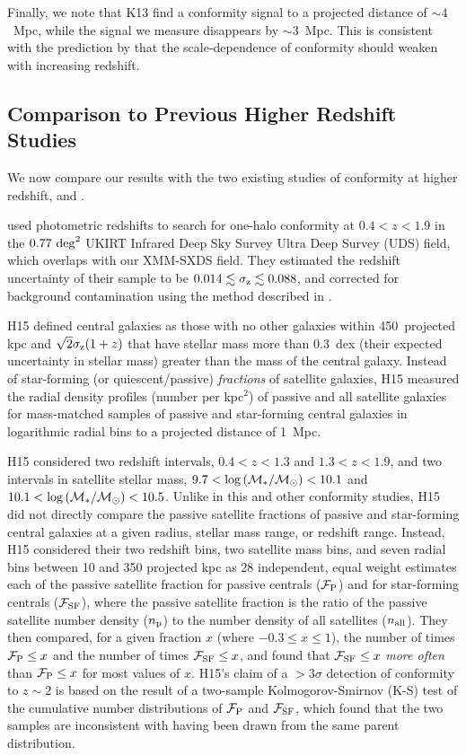Finally, we note that K13 find a conformity signal to a projected distance of $\sim4$~Mpc, while the signal we measure disappears by $\sim3$~Mpc.
This is consistent with the prediction by \citet{Hearin15b} that the scale-dependence of conformity should weaken with increasing redshift.

\subsection{Comparison to Previous Higher Redshift Studies}\label{sec:compare_high}

We now compare our results with the two existing studies of conformity at higher redshift, \citet{Hartley15} and \citet{Kawinwanichakij16}.

\citet[][hereafter H15]{Hartley15} used photometric redshifts to search for one-halo conformity at ${0.4<z<1.9}$ in the ${0.77~\degsq}$ 
UKIRT Infrared Deep Sky Survey \citep[UKIDSS;][]{Lawrence07} Ultra Deep Survey (UDS) field, which overlaps with our XMM-SXDS field.
They estimated the redshift uncertainty of their sample to be ${0.014 \lesssim \sigmaz \lesssim 0.088}$, and corrected for background contamination using the method described in \citet{Chen06}.

H15 defined central galaxies as those with no other galaxies within 450~projected kpc and ${\sqrt{2}\sigmaz(1 + z)}$
that have stellar mass more than 0.3~dex (their expected uncertainty in stellar mass) greater than the mass of the central galaxy.
Instead of star-forming (or quiescent/passive) \emph{fractions} of satellite galaxies,
H15 measured the radial density profiles (number per kpc$^2$) of passive and all satellite galaxies for mass-matched samples of passive and star-forming central galaxies in logarithmic radial bins to a projected distance of 1~Mpc.

H15 considered two redshift intervals, ${0.4<z<1.3}$ and ${1.3<z<1.9}$, and two intervals in satellite stellar mass, ${9.7<\logM<10.1}$ and ${10.1<\logM<10.5}$.
Unlike in this and other conformity studies, H15 did not directly compare the passive satellite fractions of passive and star-forming central galaxies at a given radius, stellar mass range, or redshift range.
Instead, H15 considered their two redshift bins, two satellite mass bins, and seven radial bins between 10 and 350 projected kpc as 28 independent, equal weight 
estimates each of the passive satellite fraction for passive centrals ($\fP$) and for star-forming centrals ($\fSF$), where the passive satellite fraction is the ratio of the passive satellite number density ($\np$) to the number density of all satellites ($\nall$).
They then compared, for a given fraction $x$ (where ${-0.3 \le x \le 1}$), the number of times ${\fP \le x}$ and the number of times ${\fSF \le x}$, and found that ${\fSF \le x}$ \emph{more often} than ${\fP \le x}$ for most values of $x$.
H15's claim of a $>3\sigma$ detection of conformity to $z\sim2$ is based on the result of a two-sample Kolmogorov-Smirnov (K-S) test of the cumulative number distributions of $\fP$ and $\fSF$, which found that the two samples are inconsistent with having been drawn from the same parent distribution.

